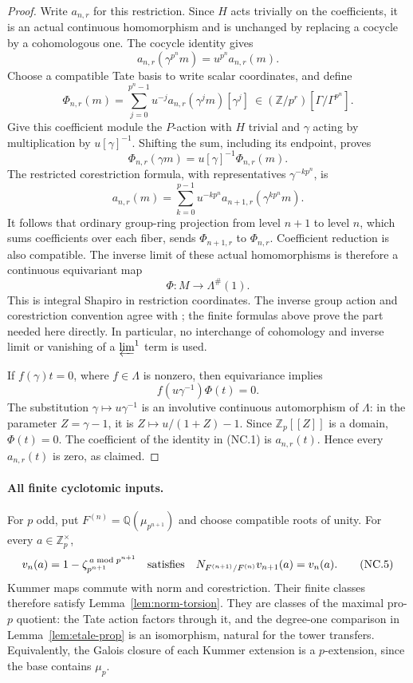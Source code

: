 \documentclass[11pt,a4paper]{article}
\theoremstyle{definition}
\begin{document}
\begin{proof}
Write \(a_{n,r}\) for this restriction.  Since \(H\) acts trivially
on the coefficients, it is an actual continuous homomorphism and is
unchanged by replacing a cocycle by a cohomologous one.  The cocycle
identity gives
\[
 a_{n,r}(\gamma^{p^n}m)=u^{p^n}a_{n,r}(m).
\]
Choose a compatible Tate basis to write scalar coordinates, and define
\[
 \Phi_{n,r}(m)=
 \sum_{j=0}^{p^n-1}u^{-j}a_{n,r}(\gamma^j m)[\gamma^j]
 \ \in(\mathbb Z/p^r)[\Gamma/\Gamma^{p^n}].                 \tag{NC.1}
\]
Give this coefficient module the \(P\)-action with \(H\) trivial and
\(\gamma\) acting by multiplication by \(u[\gamma]^{-1}\).
Shifting the sum, including its endpoint, proves
\[
 \Phi_{n,r}(\gamma m)=u[\gamma]^{-1}\Phi_{n,r}(m).
                                                               \tag{NC.2}
\]
The restricted corestriction formula, with representatives
\(\gamma^{-kp^n}\), is
\[
 a_{n,r}(m)=
 \sum_{k=0}^{p-1}u^{-kp^n}a_{n+1,r}(\gamma^{kp^n}m).
                                                               \tag{NC.3}
\]
It follows that ordinary group-ring projection from level \(n+1\)
to level \(n\), which sums coefficients over each fiber, sends
\(\Phi_{n+1,r}\) to \(\Phi_{n,r}\).  Coefficient reduction is also
compatible.  The inverse limit of these actual homomorphisms is
therefore a continuous equivariant map
\[
                  \Phi:M\longrightarrow\Lambda^\#(1).     \tag{NC.4}
\]
This is integral Shapiro in restriction coordinates.  The inverse
group action and corestriction convention agree with
\cite[\S2.5, pp.~16--17]{SharifiReciprocity2017};
the finite formulas above prove the part needed here directly.
In particular, no interchange of cohomology and inverse limit or
vanishing of a \(\varprojlim^1\) term is used.

If \(f(\gamma)t=0\), where \(f\in\Lambda\) is nonzero, then
equivariance implies
\[
                   f(u\gamma^{-1})\Phi(t)=0.
\]
The substitution \(\gamma\mapsto u\gamma^{-1}\) is an involutive
continuous automorphism of \(\Lambda\): in the parameter
\(Z=\gamma-1\), it is \(Z\mapsto u/(1+Z)-1\).
Since \(\mathbb Z_p[[Z]]\) is a domain, \(\Phi(t)=0\).
The coefficient of the identity in (NC.1) is \(a_{n,r}(t)\).
Hence every \(a_{n,r}(t)\) is zero, as claimed.
\end{proof}

\paragraph{All finite cyclotomic inputs.}
For \(p\) odd, put \(F^{(n)}=\mathbb Q(\mu_{p^{n+1}})\) and choose
compatible roots of unity.  For every \(a\in\mathbb Z_p^\times\),
\[
 v_n(a)=1-\zeta_{p^{n+1}}^{\,a\bmod p^{n+1}}
 \quad\hbox{satisfies}\quad
 N_{F^{(n+1)}/F^{(n)}}v_{n+1}(a)=v_n(a).                    \tag{NC.5}
\]
Kummer maps commute with norm and corestriction.  Their finite
classes therefore satisfy Lemma~\ref{lem:norm-torsion}.
They are classes of the maximal pro-\(p\) quotient: the Tate
action factors through it, and the degree-one comparison in
Lemma~\ref{lem:etale-prop} is an isomorphism, natural for the
tower transfers.  Equivalently, the Galois closure of each Kummer
extension is a \(p\)-extension, since the base contains \(\mu_p\).
\end{document}
